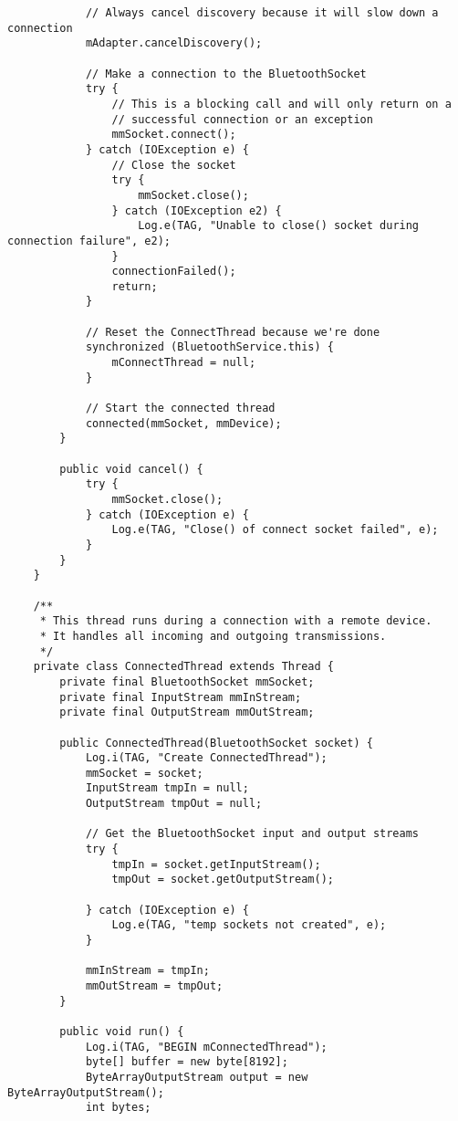 \begin{verbatim}
            // Always cancel discovery because it will slow down a connection
            mAdapter.cancelDiscovery();

            // Make a connection to the BluetoothSocket
            try {
                // This is a blocking call and will only return on a
                // successful connection or an exception
                mmSocket.connect();
            } catch (IOException e) {
                // Close the socket
                try {
                    mmSocket.close();
                } catch (IOException e2) {
                    Log.e(TAG, "Unable to close() socket during connection failure", e2);
                }
                connectionFailed();
                return;
            }

            // Reset the ConnectThread because we're done
            synchronized (BluetoothService.this) {
                mConnectThread = null;
            }

            // Start the connected thread
            connected(mmSocket, mmDevice);
        }

        public void cancel() {
            try {
                mmSocket.close();
            } catch (IOException e) {
                Log.e(TAG, "Close() of connect socket failed", e);
            }
        }
    }

    /**
     * This thread runs during a connection with a remote device.
     * It handles all incoming and outgoing transmissions.
     */
    private class ConnectedThread extends Thread {
        private final BluetoothSocket mmSocket;
        private final InputStream mmInStream;
        private final OutputStream mmOutStream;

        public ConnectedThread(BluetoothSocket socket) {
            Log.i(TAG, "Create ConnectedThread");
            mmSocket = socket;
            InputStream tmpIn = null;
            OutputStream tmpOut = null;

            // Get the BluetoothSocket input and output streams
            try {
                tmpIn = socket.getInputStream();
                tmpOut = socket.getOutputStream();

            } catch (IOException e) {
                Log.e(TAG, "temp sockets not created", e);
            }

            mmInStream = tmpIn;
            mmOutStream = tmpOut;
        }

        public void run() {
            Log.i(TAG, "BEGIN mConnectedThread");
            byte[] buffer = new byte[8192];
            ByteArrayOutputStream output = new ByteArrayOutputStream();
            int bytes;


\end{verbatim}
